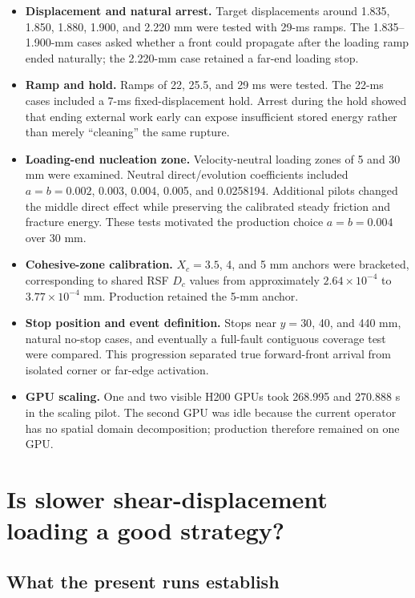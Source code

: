 \documentclass[11pt]{article}
\begin{document}
\begin{itemize}
  \item \textbf{Displacement and natural arrest.}  Target displacements around
  1.835, 1.850, 1.880, 1.900, and 2.220 mm were tested with 29-ms ramps.  The
  1.835--1.900-mm cases asked whether a front could propagate after the loading
  ramp ended naturally; the 2.220-mm case retained a far-end loading stop.
  \item \textbf{Ramp and hold.}  Ramps of 22, 25.5, and 29 ms were tested.  The
  22-ms cases included a 7-ms fixed-displacement hold.  Arrest during the hold
  showed that ending external work early can expose insufficient stored energy
  rather than merely ``cleaning'' the same rupture.
  \item \textbf{Loading-end nucleation zone.}  Velocity-neutral loading zones
  of 5 and 30 mm were examined.  Neutral direct/evolution coefficients included
  $a=b=0.002$, 0.003, 0.004, 0.005, and 0.0258194.  Additional pilots changed
  the middle direct effect while preserving the calibrated steady friction and
  fracture energy.  These tests motivated the production choice
  $a=b=0.004$ over 30 mm.
  \item \textbf{Cohesive-zone calibration.}  $X_c=3.5$, 4, and 5 mm anchors
  were bracketed, corresponding to shared RSF $D_c$ values from approximately
  $2.64\times10^{-4}$ to $3.77\times10^{-4}$ mm.  Production retained the
  5-mm anchor.
  \item \textbf{Stop position and event definition.}  Stops near $y=30$, 40,
  and 440 mm, natural no-stop cases, and eventually a full-fault contiguous
  coverage test were compared.  This progression separated true forward-front
  arrival from isolated corner or far-edge activation.
  \item \textbf{GPU scaling.}  One and two visible H200 GPUs took 268.995 and
  270.888 s in the scaling pilot.  The second GPU was idle because the current
  operator has no spatial domain decomposition; production therefore remained
  on one GPU.
\end{itemize}

\section{Is slower shear-displacement loading a good strategy?}

\subsection{What the present runs establish}
\end{document}
